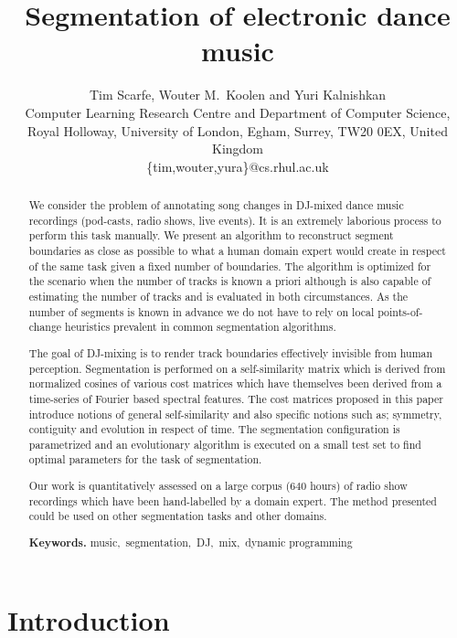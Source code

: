 \documentclass[twocolumn]{article}
\author{Tim Scarfe, Wouter M.~Koolen and Yuri Kalnishkan \\ 
	Computer Learning Research
	Centre and Department of Computer Science, \\ 
	Royal Holloway,  University of London, Egham, Surrey, TW20 0EX, United Kingdom\\
	\{tim,wouter,yura\}@cs.rhul.ac.uk
}
\title{Segmentation of electronic dance music}
\begin{document}
	
	\maketitle
	
	\begin{abstract}
		
We consider the problem of annotating song changes in DJ-mixed dance music recordings (pod-casts, radio shows, live events). It is an extremely laborious process to perform this task manually. We present an algorithm to reconstruct segment boundaries as close as possible to what a human domain expert would create in respect of the same task given a fixed number of boundaries. The algorithm is optimized for the scenario when the number of tracks is known a priori although is also capable of estimating the number of tracks and is evaluated in both circumstances. As the number of segments is known in advance we do not have to rely on local points-of-change heuristics prevalent in common segmentation algorithms. 

The goal of DJ-mixing is to render track boundaries effectively invisible from human perception. Segmentation is performed on a self-similarity matrix which is derived from normalized cosines of various cost matrices which have themselves been derived from a time-series of Fourier based spectral features. The cost matrices proposed in this paper introduce notions of general self-similarity and also specific notions such as; symmetry, contiguity and evolution in respect of time. The segmentation configuration is parametrized and an evolutionary algorithm is executed on a small test set to find optimal parameters for the task of segmentation. 

Our work is quantitatively assessed on a large corpus ($640$ hours) of radio show recordings which have been hand-labelled by a domain expert. The method presented could be used on other segmentation tasks and other domains. 
		\smallskip
		
		\noindent \textbf{Keywords.} \noindent music,~segmentation,~DJ,~mix,~dynamic programming
		
	\end{abstract}
	
	
	\vspace{1em}
	
	\section{Introduction}
	
\end{document}
